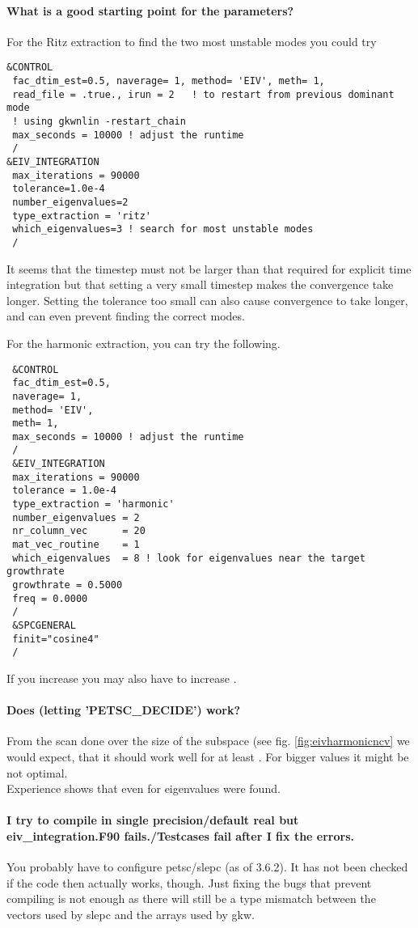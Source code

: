 \paragraph{What is a good starting point for the parameters?}

For the Ritz extraction
to find the two most unstable modes you could try
\begin{verbatim}
&CONTROL
 fac_dtim_est=0.5, naverage= 1, method= 'EIV', meth= 1,
 read_file = .true., irun = 2   ! to restart from previous dominant mode
 ! using gkwnlin -restart_chain
 max_seconds = 10000 ! adjust the runtime
 /
&EIV_INTEGRATION
 max_iterations = 90000
 tolerance=1.0e-4
 number_eigenvalues=2
 type_extraction = 'ritz'
 which_eigenvalues=3 ! search for most unstable modes
 /
\end{verbatim}
It seems that the timestep must not be larger than that required for explicit time integration
but that setting a very small timestep makes the convergence take longer.
Setting the tolerance too small can also cause convergence to take longer, and can even prevent finding
the correct modes.

For the harmonic extraction, you can try the following.
\begin{verbatim}
 &CONTROL
 fac_dtim_est=0.5,
 naverage= 1,
 method= 'EIV',
 meth= 1,
 max_seconds = 10000 ! adjust the runtime
 /
 &EIV_INTEGRATION
 max_iterations = 90000
 tolerance = 1.0e-4
 type_extraction = 'harmonic'
 number_eigenvalues = 2
 nr_column_vec      = 20
 mat_vec_routine    = 1
 which_eigenvalues  = 8 ! look for eigenvalues near the target growthrate
 growthrate = 0.5000 
 freq = 0.0000
 /
 &SPCGENERAL
 finit="cosine4"
 /
 \end{verbatim}
If you increase  you may also have to increase
.

\paragraph{Does  (letting 'PETSC_DECIDE') work?}

From the scan done over the size of the subspace (see fig. \ref{fig:eivharmonicncv}
we would expect, that it should work well for at least .
For bigger values it might be not optimal.\\
Experience shows that even for  eigenvalues 
were found.

\paragraph{I try to compile in single precision/default real but
eiv_integration.F90 fails./Testcases fail after I fix the errors.}
You probably have to configure {\sc pets}c/{\sc slep}c
  (as of 3.6.2). It has not been checked if the
code then actually works, though.
Just fixing the bugs that prevent compiling is not enough as there will still
be a type mismatch between the vectors used by {\sc slep}c and the arrays
used by gkw.

